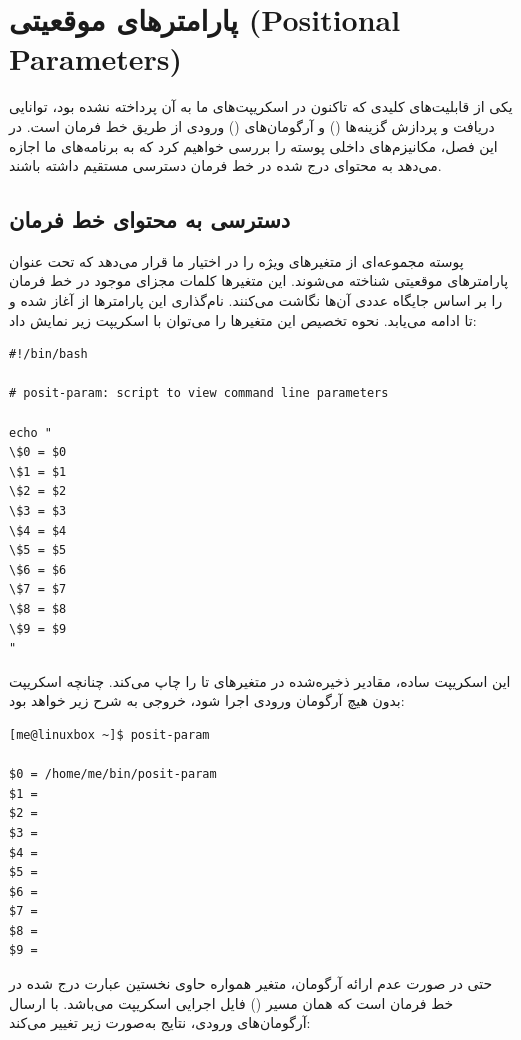 \chapter{پارامترهای موقعیتی (Positional Parameters)}

یکی از قابلیت‌های کلیدی که تاکنون در اسکریپت‌های ما به آن پرداخته نشده بود، توانایی دریافت و پردازش گزینه‌ها () و آرگومان‌های () ورودی از طریق خط فرمان است. در این فصل، مکانیزم‌های داخلی پوسته را بررسی خواهیم کرد که به برنامه‌های ما اجازه می‌دهد به محتوای درج شده در خط فرمان دسترسی مستقیم داشته باشند.

\section{دسترسی به محتوای خط فرمان}

پوسته مجموعه‌ای از متغیرهای ویژه را در اختیار ما قرار می‌دهد که تحت عنوان پارامترهای موقعیتی شناخته می‌شوند. این متغیرها کلمات مجزای موجود در خط فرمان را بر اساس جایگاه عددی آن‌ها نگاشت می‌کنند. نام‌گذاری این پارامترها از  آغاز شده و تا  ادامه می‌یابد. نحوه تخصیص این متغیرها را می‌توان با اسکریپت زیر نمایش داد:

\begin{latin}
\begin{lstlisting}
#!/bin/bash

# posit-param: script to view command line parameters

echo "
\$0 = $0
\$1 = $1
\$2 = $2
\$3 = $3
\$4 = $4
\$5 = $5
\$6 = $6
\$7 = $7
\$8 = $8
\$9 = $9
"
\end{lstlisting}
\end{latin}

این اسکریپت ساده، مقادیر ذخیره‌شده در متغیرهای  تا  را چاپ می‌کند. چنانچه اسکریپت بدون هیچ آرگومان ورودی اجرا شود، خروجی به شرح زیر خواهد بود:

\begin{latin}
\begin{lstlisting}
[me@linuxbox ~]$ posit-param

$0 = /home/me/bin/posit-param
$1 =
$2 =
$3 =
$4 =
$5 =
$6 =
$7 =
$8 =
$9 =
\end{lstlisting}
\end{latin}

حتی در صورت عدم ارائه آرگومان، متغیر  همواره حاوی نخستین عبارت درج شده در خط فرمان است که همان مسیر () فایل اجرایی اسکریپت می‌باشد. با ارسال آرگومان‌های ورودی، نتایج به‌صورت زیر تغییر می‌کند:

